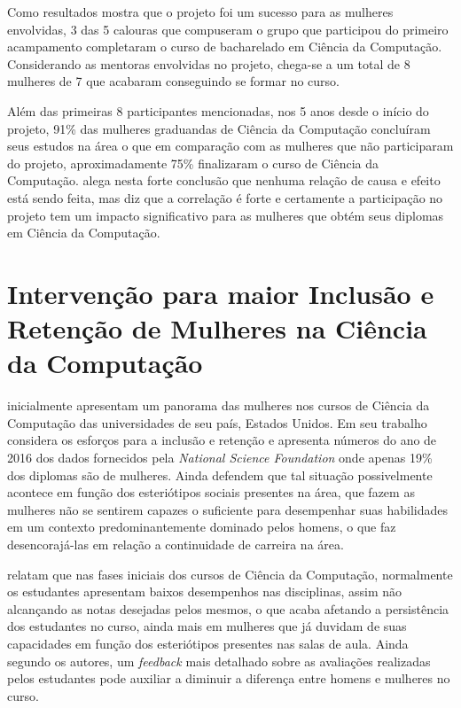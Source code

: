 Como resultados  mostra que o projeto foi um sucesso para as mulheres envolvidas, 3 das 5 calouras que compuseram o grupo que participou do primeiro acampamento completaram o curso de bacharelado em Ciência da Computação. Considerando as mentoras envolvidas no projeto, chega-se a um total de 8 mulheres de 7 que acabaram conseguindo se formar no curso. 

Além das primeiras 8 participantes mencionadas, nos 5 anos desde o início do projeto, 91\% das mulheres graduandas de Ciência da Computação concluíram seus estudos na área o que em comparação com as mulheres que não participaram do projeto, aproximadamente 75\% finalizaram o curso de Ciência da Computação.  alega nesta forte conclusão que nenhuma relação de causa e efeito está sendo feita, mas diz que a correlação é forte e certamente a participação no projeto tem um impacto significativo para as mulheres que obtém seus diplomas em Ciência da Computação.



\section{Intervenção para maior Inclusão e Retenção de Mulheres na Ciência da Computação}\label{sec:intervencaoinclusaoretencao}
 inicialmente apresentam um panorama das mulheres nos cursos de Ciência da Computação das universidades de seu país, Estados Unidos. Em seu trabalho considera 
os esforços para a inclusão e retenção e apresenta números do ano de 2016 dos dados fornecidos pela \textit{National Science Foundation} onde apenas 19\% dos diplomas são de mulheres. Ainda defendem que tal situação possivelmente acontece em função dos esteriótipos sociais presentes na área, que fazem as mulheres não se sentirem capazes o suficiente para desempenhar suas habilidades em um contexto predominantemente dominado pelos homens, o que faz desencorajá-las em relação a continuidade de carreira na área.

 relatam que nas fases iniciais dos cursos de Ciência da Computação, normalmente os estudantes apresentam baixos desempenhos nas disciplinas, assim não alcançando as notas desejadas pelos mesmos, o que acaba afetando a persistência dos estudantes no curso, ainda mais em mulheres que já duvidam de suas capacidades em função dos esteriótipos presentes nas salas de aula. Ainda segundo os autores, um \textit{feedback} mais detalhado sobre as avaliações realizadas pelos estudantes pode auxiliar a diminuir a diferença entre homens e mulheres no curso.

